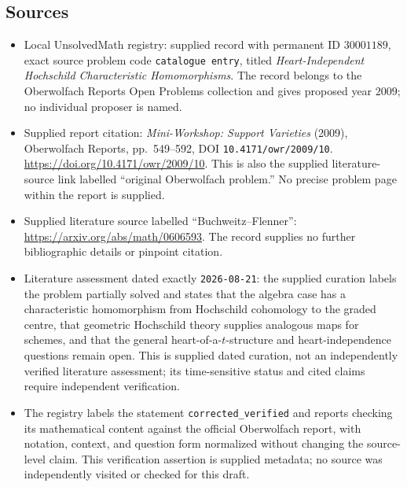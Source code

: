 \documentclass[11pt]{article}
\begin{document}
\subsection{Sources}
\begin{itemize}
\item Local UnsolvedMath registry: supplied record with permanent ID \(30001189\), exact source problem code \texttt{catalogue entry}, titled \emph{Heart-Independent Hochschild Characteristic Homomorphisms}. The record belongs to the Oberwolfach Reports Open Problems collection and gives proposed year \(2009\); no individual proposer is named.
\item Supplied report citation: \emph{Mini-Workshop: Support Varieties} (2009), Oberwolfach Reports, pp.\ 549--592, DOI \texttt{10.4171/owr/2009/10}. \url{https://doi.org/10.4171/owr/2009/10}. This is also the supplied literature-source link labelled ``original Oberwolfach problem.'' No precise problem page within the report is supplied.
\item Supplied literature source labelled ``Buchweitz--Flenner'': \url{https://arxiv.org/abs/math/0606593}. The record supplies no further bibliographic details or pinpoint citation.
\item Literature assessment dated exactly \texttt{2026-08-21}: the supplied curation labels the problem partially solved and states that the algebra case has a characteristic homomorphism from Hochschild cohomology to the graded centre, that geometric Hochschild theory supplies analogous maps for schemes, and that the general heart-of-a-\(t\)-structure and heart-independence questions remain open. This is supplied dated curation, not an independently verified literature assessment; its time-sensitive status and cited claims require independent verification.
\item The registry labels the statement \texttt{corrected\_verified} and reports checking its mathematical content against the official Oberwolfach report, with notation, context, and question form normalized without changing the source-level claim. This verification assertion is supplied metadata; no source was independently visited or checked for this draft.
\end{itemize}
\end{document}
